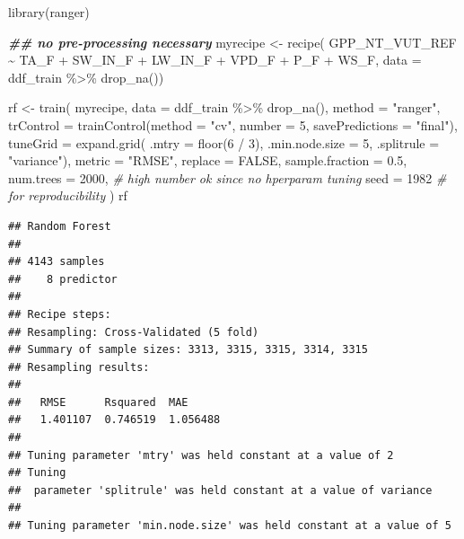 \documentclass[
]{book}
\newenvironment{Shaded}{\begin{snugshade}}{\end{snugshade}}
\newcommand{\AttributeTok}[1]{\textcolor[rgb]{0.77,0.63,0.00}{#1}}
\newcommand{\CommentTok}[1]{\textcolor[rgb]{0.56,0.35,0.01}{\textit{#1}}}
\newcommand{\ConstantTok}[1]{\textcolor[rgb]{0.00,0.00,0.00}{#1}}
\newcommand{\DecValTok}[1]{\textcolor[rgb]{0.00,0.00,0.81}{#1}}
\newcommand{\DocumentationTok}[1]{\textcolor[rgb]{0.56,0.35,0.01}{\textbf{\textit{#1}}}}
\newcommand{\FloatTok}[1]{\textcolor[rgb]{0.00,0.00,0.81}{#1}}
\newcommand{\FunctionTok}[1]{\textcolor[rgb]{0.00,0.00,0.00}{#1}}
\newcommand{\NormalTok}[1]{#1}
\newcommand{\OtherTok}[1]{\textcolor[rgb]{0.56,0.35,0.01}{#1}}
\newcommand{\SpecialCharTok}[1]{\textcolor[rgb]{0.00,0.00,0.00}{#1}}
\newcommand{\StringTok}[1]{\textcolor[rgb]{0.31,0.60,0.02}{#1}}
\begin{document}
\begin{Shaded}
\begin{Highlighting}[]
\FunctionTok{library}\NormalTok{(ranger)}

\DocumentationTok{\#\# no pre{-}processing necessary}
\NormalTok{myrecipe }\OtherTok{\textless{}{-}} \FunctionTok{recipe}\NormalTok{(}
\NormalTok{  GPP\_NT\_VUT\_REF }\SpecialCharTok{\textasciitilde{}}\NormalTok{ TA\_F }\SpecialCharTok{+}\NormalTok{ SW\_IN\_F }\SpecialCharTok{+}\NormalTok{ LW\_IN\_F }\SpecialCharTok{+}\NormalTok{ VPD\_F }\SpecialCharTok{+}\NormalTok{ P\_F }\SpecialCharTok{+}\NormalTok{ WS\_F, }
  \AttributeTok{data =}\NormalTok{ ddf\_train }\SpecialCharTok{\%\textgreater{}\%} 
    \FunctionTok{drop\_na}\NormalTok{())}

\NormalTok{rf }\OtherTok{\textless{}{-}} \FunctionTok{train}\NormalTok{(}
\NormalTok{  myrecipe, }
  \AttributeTok{data =}\NormalTok{ ddf\_train }\SpecialCharTok{\%\textgreater{}\%} 
    \FunctionTok{drop\_na}\NormalTok{(), }
  \AttributeTok{method =} \StringTok{"ranger"}\NormalTok{,}
  \AttributeTok{trControl =} \FunctionTok{trainControl}\NormalTok{(}\AttributeTok{method =} \StringTok{"cv"}\NormalTok{, }\AttributeTok{number =} \DecValTok{5}\NormalTok{, }\AttributeTok{savePredictions =} \StringTok{"final"}\NormalTok{),}
  \AttributeTok{tuneGrid =} \FunctionTok{expand.grid}\NormalTok{( }\AttributeTok{.mtry =} \FunctionTok{floor}\NormalTok{(}\DecValTok{6} \SpecialCharTok{/} \DecValTok{3}\NormalTok{),}
                          \AttributeTok{.min.node.size =} \DecValTok{5}\NormalTok{,}
                          \AttributeTok{.splitrule =} \StringTok{"variance"}\NormalTok{),}
  \AttributeTok{metric =} \StringTok{"RMSE"}\NormalTok{,}
  \AttributeTok{replace =} \ConstantTok{FALSE}\NormalTok{,}
  \AttributeTok{sample.fraction =} \FloatTok{0.5}\NormalTok{,}
  \AttributeTok{num.trees =} \DecValTok{2000}\NormalTok{,          }\CommentTok{\# high number ok since no hperparam tuning}
  \AttributeTok{seed =} \DecValTok{1982}                \CommentTok{\# for reproducibility}
\NormalTok{)}
\NormalTok{rf}
\end{Highlighting}
\end{Shaded}

\begin{verbatim}
## Random Forest 
## 
## 4143 samples
##    8 predictor
## 
## Recipe steps:  
## Resampling: Cross-Validated (5 fold) 
## Summary of sample sizes: 3313, 3315, 3315, 3314, 3315 
## Resampling results:
## 
##   RMSE      Rsquared  MAE     
##   1.401107  0.746519  1.056488
## 
## Tuning parameter 'mtry' was held constant at a value of 2
## Tuning
##  parameter 'splitrule' was held constant at a value of variance
## 
## Tuning parameter 'min.node.size' was held constant at a value of 5
\end{verbatim}
\end{document}
